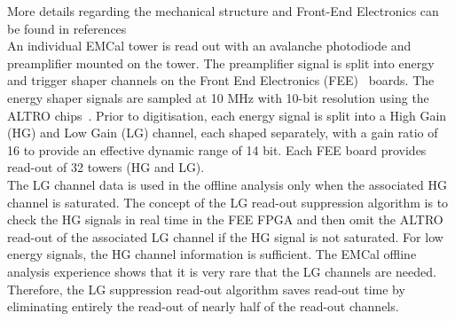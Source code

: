 More details regarding the mechanical structure and Front-End Electronics can be found in references~\cite{Cortese:2008zza, Allen:2010stl}\\
%
An individual EMCal tower is read out with an avalanche photodiode and preamplifier mounted on the tower. The preamplifier signal is split into energy and trigger shaper channels on the Front End Electronics (FEE)~\cite{Muller:2006jr} boards. The energy shaper signals are sampled at 10 MHz with 10-bit resolution using the ALTRO 
chips~\cite{EsteveBosch:2003bj}. Prior to digitisation, each energy signal is split into a High Gain (HG) and Low Gain (LG) channel, each shaped separately, with a gain ratio of 16 to provide an effective dynamic range of 14 bit. Each FEE board provides read-out of 32 towers (HG and LG).\\
%
The LG channel data is used in the offline analysis only when the associated HG channel is saturated. The concept of the LG read-out suppression algorithm is to check the HG signals in real time in the FEE FPGA and then omit the ALTRO read-out of the associated LG channel if the HG signal is not saturated. For low energy signals, the HG channel information is sufficient. The EMCal offline analysis experience shows that it is very rare that the LG channels are needed. Therefore, the LG suppression read-out algorithm saves read-out time by eliminating entirely the read-out of nearly half of the read-out channels. 
%
